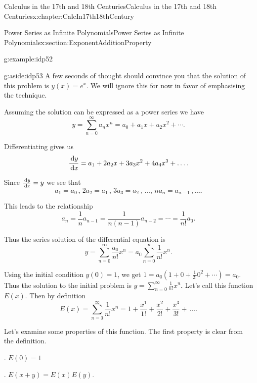 \begin{chapterptx}{Calculus in the 17th and 18th Centuries}{}{Calculus in the 17th and 18th Centuries}{}{}{x:chapter:CalcIn17th18thCentury}
\begin{sectionptx}{Power Series as Infinite Polynomials}{}{Power Series as Infinite Polynomials}{}{}{x:section:ExponentAdditionProperty}
\begin{example}{}{g:example:idp52}
			\begin{aside}{}{g:aside:idp53}%
				A few seconds of thought should convince you that the solution of this problem is \(y(x) = e^x\).  We will ignore this for now in favor of emphasising the technique.%
			\end{aside}
			Assuming the solution can be expressed as a power series we have%
			\begin{equation*}
				y=\sum_{n=0}^\infty a_nx^n=a_0+a_1x+a_2x^2+\cdots\text{.}
			\end{equation*}
			\par
			Differentiating gives us%
			\begin{equation*}
				\frac{\,{\rm d} y}{\,{\rm d} x}=a_1+2a_2x+3a_3x^2+4a_4x^3+\ldots\text{.}
			\end{equation*}
			\par
			Since \(\frac{\,{\rm d} y}{\,{\rm d} x}=y\) we see that%
			\begin{equation*}
				a_1=a_0\,,\,2a_2=a_1\,,\,3a_3=a_2\,,\,\ldots,\,na_n=a_{n-1}\,,\ldots\text{.}
			\end{equation*}
			\par
			This leads to the relationship%
			\begin{equation*}
				a_n=\frac{1}{n}a_{n-1}=\frac{1}{n(n-1)}a_{n-2}=\cdots=\frac{1}{n!}a_0\text{.}
			\end{equation*}
			\par
			Thus the series solution of the differential equation is%
			\begin{equation*}
				y=\sum_{n=0}^\infty\frac{a_0}{n!}x^n=a_0\sum_{n=0}^\infty\frac{1}{n!}x^n\text{.}
			\end{equation*}
			\par
			Using the initial condition \(y(0)=1\), we get \(1=a_0(1+0+\frac{1}{2!}0^2+\cdots)=a_0\). Thus the solution to the initial problem is \(y=\sum_{n=0}^\infty\frac{1}{n!}x^n\). Let's call this function \(E(x)\). Then by definition%
			\begin{equation*}
				E(x)=\sum_{n=0}^\infty\frac{1}{n!}x^n=1+\frac{x^1}{1!}+\frac{x^2}{2!}+\frac{x^3}{3!}+\,\ldots\text{.}
			\end{equation*}
		\end{example}
		Let's examine some properties of this function. The first property is clear from the definition.%
		\par
		 . \(E(0)=1\)%
		\par
		 . \(E(x+y)=E(x)E(y)\).%

\end{sectionptx}
\end{chapterptx}
